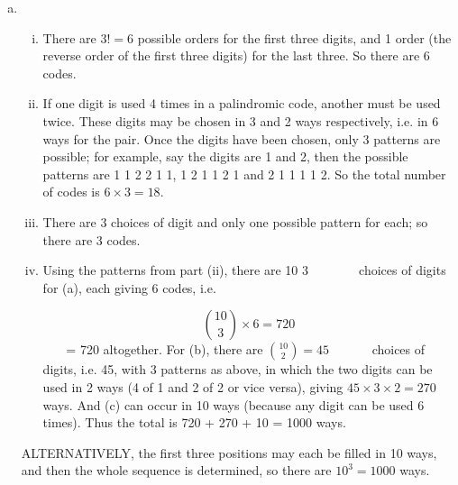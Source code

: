 \documentclass[a4paper,12pt]{article}
\begin{document}
\begin{enumerate}[(a)]
\begin{framed}
(iii) How many palindromic sort codes can be formed altogether, using digits
chosen from \{0, 1, 2, \ldots,9\}?

\end{framed}
\item  

\begin{enumerate}[(i)]
    \item  There are $3! = 6$ possible orders for the first three digits, and 1 order
(the reverse order of the first three digits) for the last three. So there
are 6 codes.
\item If one digit is used 4 times in a palindromic code, another must be used
twice. These digits may be chosen in 3 and 2 ways respectively, i.e. in
6 ways for the pair. Once the digits have been chosen, only 3 patterns
are possible; for example, say the digits are 1 and 2, then the possible
patterns are 1 1 2 2 1 1, 1 2 1 1 2 1 and 2 1 1 1 1 2. So the total
number of codes is $6 \times 3 = 18$.
\item There are 3 choices of digit and only one possible pattern for each; so
there are 3 codes.
\item  Using the patterns from part (ii), there are
10
3
 
 
 
choices of digits for (a), each
giving 6 codes, i.e.

\[ { 10 \choose 3} \times 6 = 720\]

 
 = 720 altogether. For (b), there are
${ 10 \choose 2} = 45$ 
 
 
choices
of digits, i.e. 45, with 3 patterns as above, in which the two digits can be used
in 2 ways (4 of 1 and 2 of 2 or vice versa), giving $45 \times 3 \times 2 = 270$ ways. And
(c) can occur in 10 ways (because any digit can be used 6 times). Thus the
total is 720 + 270 + 10 = 1000 ways.
\end{enumerate}
ALTERNATIVELY, the first three positions may each be filled in 10 ways,
and then the whole sequence is determined, so there are $10^3 = 1000$ ways.
\end{enumerate}
\end{document}
